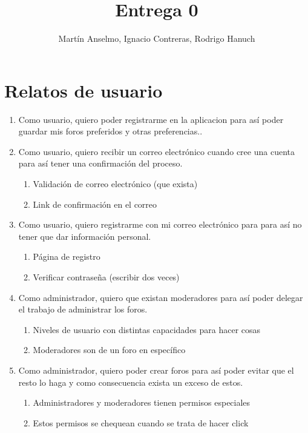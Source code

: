 \documentclass[12pt, letterpaper, notitlepage]{article}
\title{\textbf{Entrega 0}}
\author{Martín Anselmo, Ignacio Contreras, Rodrigo Hanuch}
\begin{document}
    \clearpage\maketitle
    \thispagestyle{empty}

    \newpage

    \section*{Relatos de usuario}
    \newcommand{\story}[3]{Como {#1}, quiero {#2} para {#3}.}

    \begin{enumerate}

        \item \story{usuario}{poder registrarme en la aplicacion}
        {así poder guardar mis foros preferidos y otras preferencias.}


        \item \story{usuario}{recibir un correo electrónico cuando cree una cuenta}
        {así tener una confirmación del proceso}
        \begin{enumerate}
            \item Validación de correo electrónico (que exista)
            \item Link de confirmación en el correo
        \end{enumerate}

        \item \story{usuario}{registrarme con mi correo electrónico}{para así no tener que
        dar información personal}
        \begin{enumerate}
            \item Página de registro
            \item Verificar contraseña (escribir dos veces)
        \end{enumerate}

        \item \story{administrador}{que existan moderadores}{así poder delegar el trabajo de administrar los foros}
        \begin{enumerate}
            \item Niveles de usuario con distintas capacidades para hacer cosas
            \item Moderadores son de un foro en específico
        \end{enumerate}

        \item \story{administrador}{poder crear foros}{así poder evitar que el resto lo haga y como consecuencia exista un exceso de estos}
        \begin{enumerate}
            \item Administradores y moderadores tienen permisos especiales
            \item Estos permisos se chequean cuando se trata de hacer click
        \end{enumerate}


\end{enumerate}
\end{document}
